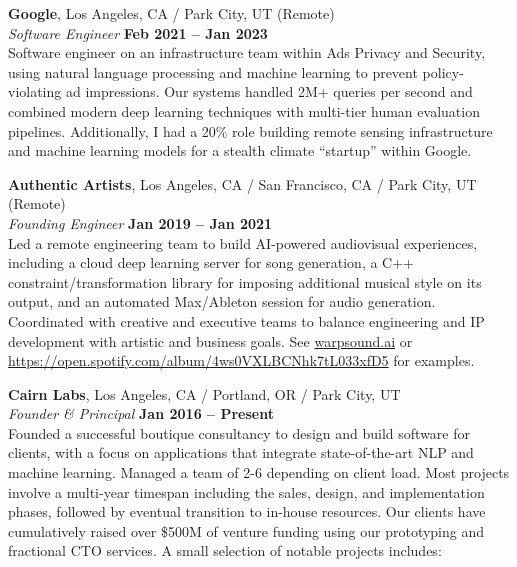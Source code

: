 \documentclass[margin,line]{resume}
\begin{document}
\begin{resume}
    \textbf{Google}, Los Angeles, CA / Park City, UT (Remote)  \vspace{2mm}\\\vspace{1mm}%
    \textsl{Software Engineer} \hfill \textbf{Feb 2021 -- Jan 2023}\\
    Software engineer on an infrastructure team within Ads Privacy and Security,
    using natural language processing and machine learning to prevent
    policy-violating ad impressions. Our systems handled 2M+ queries per second
    and combined modern deep learning techniques with multi-tier human
    evaluation pipelines. Additionally, I had a 20\% role building
    remote sensing infrastructure and machine learning models for a stealth
    climate ``startup'' within Google.

    \textbf{Authentic Artists}, Los Angeles, CA / San Francisco, CA / Park City, UT (Remote) \vspace{2mm}\\\vspace{1mm}%
    \textsl{Founding Engineer} \hfill \textbf{Jan 2019 -- Jan 2021}\\
    Led a remote engineering team to build AI-powered audiovisual
    experiences, including a cloud deep learning server for song generation, a
    C++ constraint/transformation library for imposing additional musical style
    on its output, and an automated Max/Ableton session for audio generation.
    Coordinated with creative and executive teams to balance engineering and IP
    development with artistic and business goals. See \url{warpsound.ai} or
    \url{https://open.spotify.com/album/4ws0VXLBCNhk7tL033xfD5} for examples.

    \textbf{Cairn Labs}, Los Angeles, CA / Portland, OR / Park City, UT \vspace{2mm}\\\vspace{1mm}%
    \textsl{Founder \& Principal} \hfill \textbf{Jan 2016 -- Present}\\
    Founded a successful boutique consultancy to design and build software
    for clients, with a focus on applications that integrate state-of-the-art
    NLP and machine learning. Managed a team of 2-6 depending on client load.
    Most projects involve a multi-year timespan including the sales, design, and
    implementation phases, followed by eventual transition to in-house
    resources. Our clients have cumulatively raised over \$500M of venture
    funding using our prototyping and fractional CTO services. A small selection
    of notable projects includes:


\end{resume}
\end{document}
